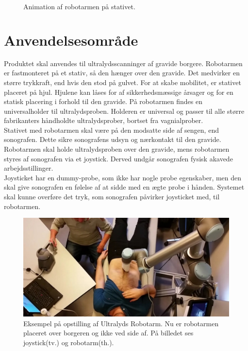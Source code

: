 \begin{figure}[H]
\begin{minipage}{0.55\textwidth}
		\caption{Animation af robotarmen på stativet.}
		\label{Robotstativ}
	\end{minipage}
\end{figure}

\section{Anvendelsesområde}
Produktet skal anvendes til ultralydsscanninger af gravide borgere. Robotarmen er fastmonteret på et stativ, så den hænger over den gravide. Det medvirker en større trykkraft, end hvis den stod på gulvet. For at skabe mobilitet, er stativet placeret på hjul. Hjulene kan låses for af sikkerhedsmæssige årsager og for en statisk placering i forhold til den gravide. På robotarmen findes en universalholder til ultralydsproben. Holderen er universal og passer til alle større fabrikanters håndholdte ultralydsprober, bortset fra vagnialprober.\\

Stativet med robotarmen skal være på den modsatte side af sengen, end sonografen. Dette sikre sonografens udsyn og nærkontakt til den gravide.
Robotarmen skal holde ultralydsproben over den gravide, mens robotarmen styres af sonografen via et joystick. Derved undgår sonografen fysisk akavede arbejdsstillinger. \\
Joysticket har en dummy-probe, som ikke har nogle probe egenskaber, men den skal give sonografen en følelse af at sidde med en ægte probe i hånden.
Systemet skal kunne overføre det tryk, som sonografen påvirker joysticket med, til robotarmen.

\begin{figure}[H]\centering
	\includegraphics[width = 1.0\textwidth]{Figurer/ergonomiskLosning.jpg}
	\caption{Eksempel på opstilling af Ultralyds Robotarm. Nu er robotarmen placeret over borgeren og ikke ved side af. På billedet ses joystick(tv.) og robotarm(th.).  }
	\label{ergonomiskLosning}
\end{figure}

